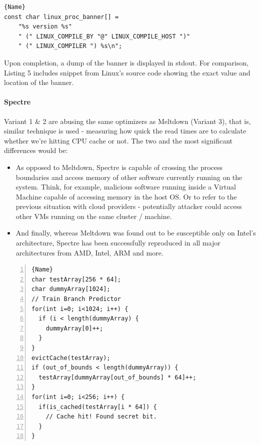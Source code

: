 \documentclass{article}
\begin{document}
\begin{lstlisting}[caption=init/version.c from Linux kernel source code, frame=tlrb, breaklines=true]{Name}
const char linux_proc_banner[] =
	"%s version %s"
	" (" LINUX_COMPILE_BY "@" LINUX_COMPILE_HOST ")"
	" (" LINUX_COMPILER ") %s\n";
\end{lstlisting}

Upon completion, a dump of the banner is displayed in stdout. For comparison, Listing 5 includes snippet from Linux's source code \cite{linuxsrc} showing the exact value and location of the banner. 

\paragraph{Spectre}
Variant 1 \& 2 are abusing the same optimizers as Meltdown (Variant 3), that is, similar technique is used - measuring how quick the read times are to calculate whether we're hitting CPU cache or not. The two and the most significant differences would be:

\begin{itemize}
  \item As opposed to Meltdown, Spectre is capable of crossing the process boundaries and access memory of other software currently running on the system. Think, for example, malicious software running inside a Virtual Machine capable of accessing memory in the host OS. Or to refer to the previous situation with cloud providers - potentially attacker could access other VMs running on the same cluster / machine.
  \item And finally, whereas Meltdown was found out to be susceptible only on Intel's architecture, Spectre has been successfully reproduced in all major architectures from AMD, Intel, ARM and more. 
\end{itemize}

\begin{lstlisting}[caption=Spectre PoC,frame=tlrb, numbers=left, firstnumber=1, float]{Name}
char testArray[256 * 64];
char dummyArray[1024];
// Train Branch Predictor
for(int i=0; i<1024; i++) {
  if (i < length(dummyArray) {
    dummyArray[0]++;
  }
}
evictCache(testArray);
if (out_of_bounds < length(dummyArray)) {
  testArray[dummyArray[out_of_bounds] * 64]++;
}
for(int i=0; i<256; i++) {
  if(is_cached(testArray[i * 64]) {
    // Cache hit! Found secret bit.
  }
}
\end{lstlisting}
\end{document}
